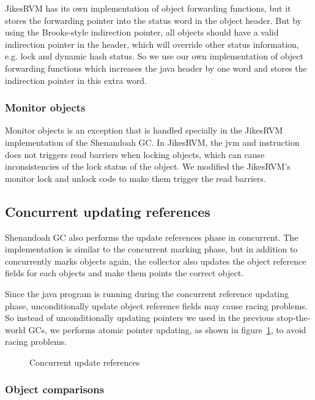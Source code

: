 JikesRVM has its own implementation of object forwarding functions, but it stores the forwarding
pointer into the status word in the object header. But by using the Brooks-style indirection
pointer, all objects should have a valid indirection pointer in the header, which will override other status
information, e.g. lock and dynamic hash status. So we use our own implementation of
object forwarding functions which increases the java header by one word and stores the indirection
pointer in this extra word.

\subsubsection{Monitor objects}

Monitor objects is an exception that is handled specially in the JikesRVM implementation of the Shenandoah GC.
In JikesRVM, the jvm  and  instruction
does not triggers read barriers when locking objects, which can cause inconsistencies 
of the lock status of the object. We modified the JikesRVM's monitor lock and unlock
code to make them trigger the read barriers.

\subsection{Concurrent updating references}

Shenandoah GC also performs the update references phase in concurrent.
The implementation is similar to the concurrent marking phase, but in addition to
concurrently marks objects again, the collector also updates the object reference fields
for each objects and make them points the correct object.

Since the java program is running during the concurrent reference updating phase,
unconditionally update object reference fields may cause racing problems. So instead of
unconditionally updating pointers we used in the previous stop-the-world GCs, we performs
atomic pointer updating, as shown in figure~\ref{fig:concupdaterefs},
to avoid racing problems.

\begin{figure}
  \centering
  
  \caption{Concurrent update references}
  \label{fig:concupdaterefs}
\end{figure}

\subsubsection{Object comparisons}

